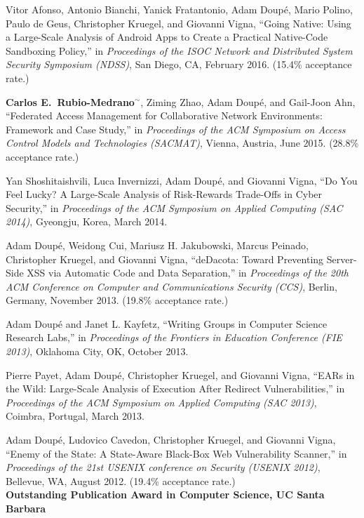 \documentclass[11pt,letterpaper,sans]{moderncv}
\begin{document}
\begin{etaremune}
\item Vitor Afonso, Antonio Bianchi, Yanick Fratantonio, Adam
  Doup\'e, Mario Polino, Paulo de Geus, Christopher Kruegel, and
  Giovanni Vigna, ``Going Native: Using a Large-Scale Analysis of
  Android Apps to Create a Practical Native-Code Sandboxing Policy,''
  in \emph{Proceedings of the ISOC Network and Distributed System
    Security Symposium (NDSS)}, San Diego, CA, February 2016. (15.4\%
  acceptance rate.)

\item \textbf{Carlos E.\ Rubio-Medrano}$^{\sim}$, Ziming Zhao, Adam
  Doup\'e, and Gail-Joon Ahn, ``Federated Access Management for
  Collaborative Network Environments: Framework and Case Study,'' in
  \emph{Proceedings of the ACM Symposium on Access Control Models and
    Technologies (SACMAT)}, Vienna, Austria, June 2015. (28.8\%
  acceptance rate.)

\item Yan Shoshitaishvili, Luca Invernizzi, Adam Doup\'e, and
  Giovanni Vigna, ``Do You Feel Lucky? A Large-Scale Analysis of
  Risk-Rewards Trade-Offs in Cyber Security,'' in \emph{Proceedings of
    the ACM Symposium on Applied Computing (SAC 2014)}, Gyeongju,
  Korea, March 2014.

\item Adam Doup\'e, Weidong Cui, Mariusz H. Jakubowski,
  Marcus Peinado, Christopher Kruegel, and Giovanni Vigna, ``deDacota:
  Toward Preventing Server-Side XSS via Automatic Code and Data
  Separation,'' in \emph{Proceedings of the 20th ACM Conference on
    Computer and Communications Security (CCS)}, Berlin, Germany,
  November 2013. (19.8\% acceptance rate.)

\item Adam Doup\'e and Janet L. Kayfetz, ``Writing Groups in
  Computer Science Research Labs,'' in \emph{Proceedings of the
    Frontiers in Education Conference (FIE 2013)}, Oklahoma City, OK,
  October 2013.

\item Pierre Payet, Adam Doup\'e, Christopher
  Kruegel, and Giovanni Vigna, ``EARs in the Wild: Large-Scale
  Analysis of Execution After Redirect Vulnerabilities,'' in
  \emph{Proceedings of the ACM Symposium on Applied Computing (SAC
    2013)}, Coimbra, Portugal, March 2013.

\item Adam Doup\'e, Ludovico Cavedon, Christopher Kruegel,
  and Giovanni Vigna, ``Enemy of the State: A State-Aware Black-Box
  Web Vulnerability Scanner,'' in \emph{Proceedings of the 21st USENIX
    conference on Security (USENIX 2012)}, Bellevue, WA, August 2012.
  (19.4\% acceptance rate.) \\
  \textbf{Outstanding Publication Award in Computer
  Science, UC Santa Barbara}


\end{etaremune}
\end{document}
